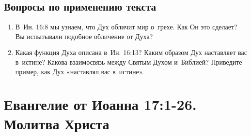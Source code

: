 \documentclass[a4paper,12pt]{article}
\begin{document}
\subsection*{Вопросы по применению текста} 
\begin{enumerate}
    \item В~Ин. 16:8 мы узнаем, что Дух обличит мир о~грехе. Как Он это сделает? Вы испытывали подобное обличение от Духа? 
    
    \myline
    
    \myline
    \item Какая функция Духа описана в~Ин. 16:13? Каким образом Дух наставляет вас в~истине? Какова взаимосвязь между Святым Духом и~Библией? Приведите пример, как Дух «наставлял вас в~истине». 
    
    \myline
    
    \myline
\end{enumerate}



\section{Евангелие от Иоанна 17:1-26. Молитва Христа}
\end{document}
